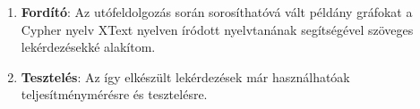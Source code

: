 \begin{enumerate}
	\item \textbf{Fordító}: Az utófeldolgozás során sorosíthatóvá vált példány gráfokat a Cypher nyelv XText nyelven íródott nyelvtanának segítségével szöveges lekérdezésekké alakítom. 
	\item \textbf{Tesztelés}: Az így elkészült lekérdezések már használhatóak teljesítménymérésre és tesztelésre.
\end{enumerate}



